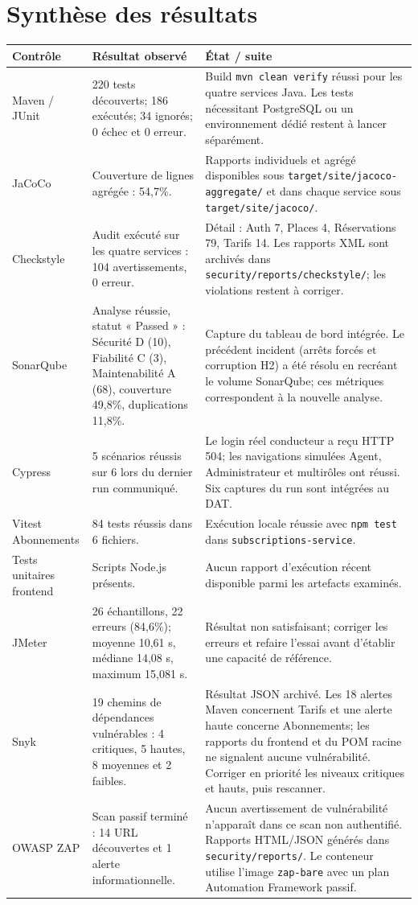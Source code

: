 \documentclass[11pt,a4paper]{report}
\begin{document}
\section{Synthèse des résultats}
\begin{longtable}{p{2.5cm}p{3.5cm}p{7cm}}
\toprule
\textbf{Contrôle} & \textbf{Résultat observé} & \textbf{État / suite} \\
\midrule
Maven / JUnit & 220 tests découverts; 186 exécutés; 34 ignorés; 0 échec et 0 erreur. & Build \texttt{mvn clean verify} réussi pour les quatre services Java. Les tests nécessitant PostgreSQL ou un environnement dédié restent à lancer séparément. \\
JaCoCo & Couverture de lignes agrégée : 54,7\%. & Rapports individuels et agrégé disponibles sous \texttt{target/site/jacoco-aggregate/} et dans chaque service sous \texttt{target/site/jacoco/}. \\
Checkstyle & Audit exécuté sur les quatre services : 104 avertissements, 0 erreur. & Détail : Auth 7, Places 4, Réservations 79, Tarifs 14. Les rapports XML sont archivés dans \texttt{security/reports/checkstyle/}; les violations restent à corriger. \\
SonarQube & Analyse réussie, statut « Passed » : Sécurité D (10), Fiabilité C (3), Maintenabilité A (68), couverture 49,8\%, duplications 11,8\%. & Capture du tableau de bord intégrée. Le précédent incident (arrêts forcés et corruption H2) a été résolu en recréant le volume SonarQube; ces métriques correspondent à la nouvelle analyse. \\
Cypress & 5 scénarios réussis sur 6 lors du dernier run communiqué. & Le login réel conducteur a reçu HTTP 504; les navigations simulées Agent, Administrateur et multirôles ont réussi. Six captures du run sont intégrées au DAT. \\
Vitest Abonnements & 84 tests réussis dans 6 fichiers. & Exécution locale réussie avec \texttt{npm test} dans \texttt{subscriptions-service}. \\
Tests unitaires frontend & Scripts Node.js présents. & Aucun rapport d'exécution récent disponible parmi les artefacts examinés. \\
JMeter & 26 échantillons, 22 erreurs (84,6\%); moyenne 10,61 s, médiane 14,08 s, maximum 15,081 s. & Résultat non satisfaisant; corriger les erreurs et refaire l'essai avant d'établir une capacité de référence. \\
Snyk & 19 chemins de dépendances vulnérables : 4 critiques, 5 hautes, 8 moyennes et 2 faibles. & Résultat JSON archivé. Les 18 alertes Maven concernent Tarifs et une alerte haute concerne Abonnements; les rapports du frontend et du POM racine ne signalent aucune vulnérabilité. Corriger en priorité les niveaux critiques et hauts, puis rescanner. \\
OWASP ZAP & Scan passif terminé : 14 URL découvertes et 1 alerte informationnelle. & Aucun avertissement de vulnérabilité n'apparaît dans ce scan non authentifié. Rapports HTML/JSON générés dans \texttt{security/reports/}. Le conteneur utilise l'image \texttt{zap-bare} avec un plan Automation Framework passif. \\
\bottomrule
\end{longtable}
\end{document}
